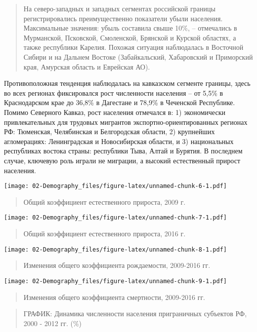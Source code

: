 \documentclass[]{book}
\begin{document}
\begin{quote}
На северо-западных и западных сегментах российской границы
регистрировались преимущественно показатели убыли населения.
Максимальные значения: убыль составила свыше 10\%, -- отмечались в
Мурманской, Псковской, Смоленской, Брянской и Курской областях, а также
республики Карелия. Похожая ситуация наблюдалась в Восточной Сибири и на
Дальнем Востоке (Забайкальский, Хабаровский и Приморский края, Амурская
область и Еврейская АО).
\end{quote}

Противоположная тенденция наблюдалась на кавказском сегменте границы,
здесь во всех регионах фиксировался рост численности населения -- от
5,5\% в Краснодарском крае до 36,8\% в Дагестане и 78,9\% в Чеченской
Республике. Помимо Северного Кавказ, рост населения отмечался в: 1)
экономически привлекательных для трудовых мигрантов
экспортно-ориентированных регионах РФ: Тюменская, Челябинская и
Белгородская области, 2) крупнейших агломерациях: Ленинградская и
Новосибирская области, и 3) национальных республиках востока страны:
республики Тыва, Алтай и Бурятия. В последнем случае, ключевую роль
играли не миграции, а высокий естественный прирост населения.

\texttt{[image: 02-Demography\_files/figure-latex/unnamed-chunk-6-1.pdf]}

\begin{quote}
Общий коэффициент естественного прироста, 2009 г.
\end{quote}

\texttt{[image: 02-Demography\_files/figure-latex/unnamed-chunk-7-1.pdf]}

\begin{quote}
Общий коэффициент естественного прироста, 2016 г.
\end{quote}

\texttt{[image: 02-Demography\_files/figure-latex/unnamed-chunk-8-1.pdf]}

\begin{quote}
Изменения общего коэффициента рождаемости, 2009-2016 гг.
\end{quote}

\texttt{[image: 02-Demography\_files/figure-latex/unnamed-chunk-9-1.pdf]}

\begin{quote}
Изменения общего коэффициента смертности, 2009-2016 гг.
\end{quote}

\begin{quote}
ГРАФИК: Динамика численности населения приграничных субъектов РФ, 2000 -
2012 гг. (\%)
\end{quote}
\end{document}
